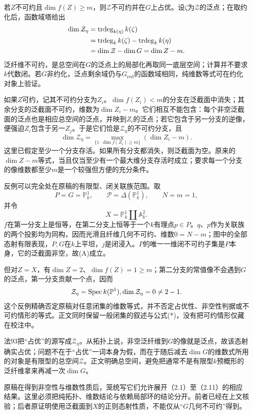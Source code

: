 若$Z$不可约且$\dim f(Z)\geq m$，则$\mathcal Z$不可约并在$G$上占优。设$\zeta$为$\mathcal Z$的泛点；在取约化后，函数域塔给出
\[
\begin{aligned}
\dim\mathcal Z_\eta
 &=\operatorname{trdeg}_{k(\eta)}k(\zeta)\\
 &=\operatorname{trdeg}_k k(\zeta)-\operatorname{trdeg}_k k(\eta)\\
 &=\dim\mathcal Z-\dim G
 =\dim Z-m.
\end{aligned}
\]
泛纤维不可约，是总空间在$G$的泛点上的局部化再取同一底层空间；计算并不要求$k$代数闭。若$G$非约化，泛点剩余域仍与$G_{\mathrm{red}}$的函数域相同，纯维数等式可在约化对象上验证。

如果$Z$可约，记其不可约分支为$Z_i$。$\dim f(Z_i)<m$的分支在泛截面中消失；其余分支的泛截面不可约，维数为$\dim Z_i-m$。它们相互不能包含：每个非空泛截面的泛点也是相应总空间的泛点，并映到$Z_i$的泛点；若它包含于另一分支的逆像，便强迫$Z_i$包含于另一$Z_j$。于是它们恰是$\mathcal Z_\eta$的不可约分支，且
\[
\dim\mathcal Z_\eta
 =\max_{\{i:\,\dim f(Z_i)\geq m\}}(\dim Z_i-m).
\tag{*}
\]
这里已假定至少一个分支存活。如果所有分支都消失，则泛截面为空。原来的$\dim Z-m$等式，当且仅当至少有一个最大维分支存活时成立；要求每一个分支的像维数都至少$m$是一个较强但方便的充分条件。

反例可以完全处在原稿的有限型、闭关联族范围。取
\[
P=G=\mathbb P^1_k,\qquad
\mathcal P=\Delta(\mathbb P^1_k),\qquad N=m=1,
\]
并令
\[
X=\mathbb P^1_k\amalg\mathbb A^2_k.
\]
$f$在第一分支上是恒等，在第二分支上恒等于一个$k$有理点$p\in P$。$q$、$p$作为关联族的两个投影均为同构，因而光滑且纤维几何不可约、维数$0=N-m$；图中的全部态射有限表现，$P,G$在$k$上平坦，$j$是闭浸入。$P$的唯一一维闭不可约子集是$P$本身，它的泛截面非空，故(A)成立。

但对$Z=X$，有$\dim Z=2$、$\dim f(Z)=1\geq m$；第二分支的常值像不会遇到$G$的泛点，第一分支贡献一个点，因而
\[
\mathcal Z_\eta=\operatorname{Spec} k(\mathbb P^1),
\dim\mathcal Z_\eta=0\ne2-1.
\]
这个反例精确否定原稿对任意闭集的维数等式，并不否定占优性、非空性判据或不可约情形的等式。正文同时保留一般闭集的叙述与公式(*)，没有把可约情形仅藏在校注中。

法93把“占优”的源写成$\mathcal Z_\eta$。从拓扑上说，非空泛纤维到$G$的像就是泛点，故该态射确实占优；问题不在于“占优”一词本身为假，而在于随后减去$\dim G$的维数式所用的对象是有限型的总空间$\mathcal Z$。正文明确总空间，避免把通常不是有限型$k$预概形的泛纤维拿来再减一次$\dim G$。

原稿在得到非空性与维数性质后，笼统写它们允许展开（2.1）至（2.11）的相应结果。这里必须把纯拓扑、维数结论与依赖局部环的结论分开。前者已经在上文核验；后者原证明使用泛截面到$X$的正则态射性质，不能仅从“$G$几何不可约”得到。

